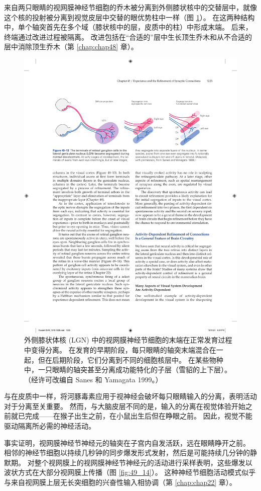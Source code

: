 来自两只眼睛的视网膜神经节细胞的乔木被分离到外侧膝状核中的交替层中，就像这个核的投射被分离到视觉皮层中交替的眼优势柱中一样（图 \ref{fig:49_13}）。 
在这两种结构中，单个轴突首先在多个域（膝状核中的层，皮质中的柱）中形成末端。 后来，终端通过改进过程被隔离。 改进包括在“合适的”层中生长顶生乔木和从不合适的层中消除顶生乔木（第 \ref{chap:chap48} 章）。

\begin{figure}[htbp]
	\centering
	\includegraphics[width=0.9\linewidth]{chap49/fig_49_13}
	\caption{外侧膝状体核 (LGN) 中的视网膜神经节细胞的末端在正常发育过程中变得分离。 在发育的早期阶段，每只眼睛的轴突末端混合在一起，但在后期阶段，它们分离到不同的细胞核层中。 在某些物种中，一只眼睛的轴突甚至分离成功能特化的子层（雪貂的上下层）。 （经许可改编自 Sanes 和 Yamagata 1999。）}
	\label{fig:49_13}
\end{figure}

与在皮质中一样，将河豚毒素应用于视神经会破坏每只眼睛输入的分离，表明活动对于分离至关重要。 然而，与大脑皮层不同的是，输入的分离在视觉体验开始之前就已完成——在猴子出生之前，在小鼠出生后但在睁眼之前。 因此，视觉不能驱动隔离所必需的神经活动。

事实证明，视网膜神经节神经元的轴突在子宫内自发活跃，远在眼睛睁开之前。 相邻的神经节细胞以持续几秒钟的同步爆发形式发射，然后是可能持续几分钟的静默期。 
对整个视网膜上的视网膜神经节神经元的活动进行采样表明，这些爆发以波状方式在大部分视网膜上传播（图 \ref{fig:49_14}）。 
这种神经节细胞活动模式似乎与来自视网膜上层无长突细胞的兴奋性输入相协调（第 \ref{chap:chap22} 章）。

